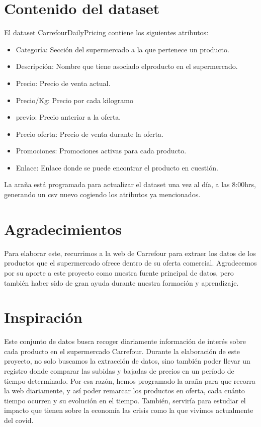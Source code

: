 \documentclass{article}
\begin{document}
\pagebreak
\section{Contenido del dataset}
El dataset CarrefourDailyPricing contiene los siguientes atributos:

\begin{itemize}
    \item {Categoría}: Sección del supermercado a la que pertenece un producto.
    \item {Descripción}: Nombre que tiene asociado elproducto en el supermercado.
    \item {Precio}: Precio de venta actual.
    \item {Precio/Kg}: Precio por cada kilogramo
    \item {previo}: Precio anterior a la oferta.
    \item {Precio oferta}: Precio de venta durante la oferta.
    \item {Promociones}: Promociones activas para cada producto.
    \item {Enlace}: Enlace donde se puede encontrar el producto en cuestión.
\end{itemize}

La araña está programada para actualizar el dataset una vez al día, a las 8:00hrs, generando un csv nuevo cogiendo los atributos ya mencionados.

\section{Agradecimientos}
Para  elaborar  este, recurrimos a  la  web  de Carrefour  para  extraer  los  datos  de  los productos que el supermercado ofrece dentro de su oferta comercial. Agradecemos por su aporte a este proyecto como  nuestra  fuente  principal de  datos,  pero  también haber sido de gran ayuda durante nuestra  formación  y aprendizaje.

\section{Inspiración}
Este conjunto de datos busca recoger diariamente información de interés sobre cada producto en  el  supermercado Carrefour.  Durante la  elaboración  de  este  proyecto,  no  solo  buscamos  la extracción de datos, sino también poder llevar un registro donde comparar las subidas y bajadas de precios en un período de tiempo determinado. Por esa razón, hemos programado la araña para que recorra la web diariamente, y así poder remarcar los productos en oferta, cada cuánto tiempo  ocurren  y  su  evolución  en  el  tiempo.  También,  serviría  para  estudiar  el  impacto  que tienen sobre la economía las crisis como la que vivimos actualmente del covid.
\end{document}
